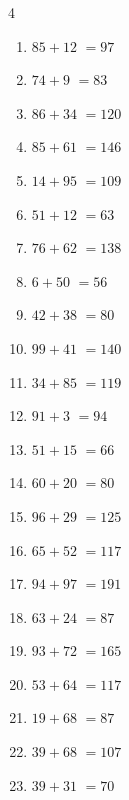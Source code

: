 \begin{multicols}{4}
\begin{enumerate}
  \item $85+12$
        $=97$

  \item $74+9$
        $=83$

  \item $86+34$
        $=120$

  \item $85+61$
        $=146$

  \item $14+95$
        $=109$

  \item $51+12$
        $=63$

  \item $76+62$
        $=138$

  \item $6+50$
        $=56$

  \item $42+38$
        $=80$

\columnbreak %

  \item $99+41$
        $=140$

  \item $34+85$
        $=119$

  \item $91+3$
        $=94$

  \item $51+15$
        $=66$

  \item $60+20$
        $=80$

  \item $96+29$
        $=125$

  \item $65+52$
        $=117$

  \item $94+97$
        $=191$

  \item $63+24$
        $=87$

  \item $93+72$
        $=165$

  \item $53+64$
        $=117$

  \item $19+68$
        $=87$

  \item $39+68$
        $=107$

  \item $39+31$
        $=70$


\end{enumerate}
\end{multicols}
